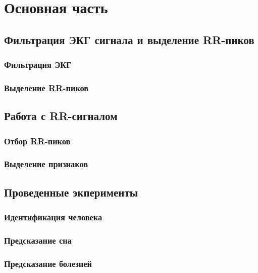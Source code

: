 \chapter{Основная часть}
\section{Фильтрация ЭКГ сигнала и выделение RR-пиков}
\subsection{Фильтрация ЭКГ}
\subsection{Выделение RR-пиков}
\section{Работа с RR-сигналом}
\subsection{Отбор RR-пиков}
\subsection{Выделение признаков}
\section{Проведенные экперименты}
\subsection{Идентификация человека}
\subsection{Предсказание сна}
\subsection{Предсказание болезней}